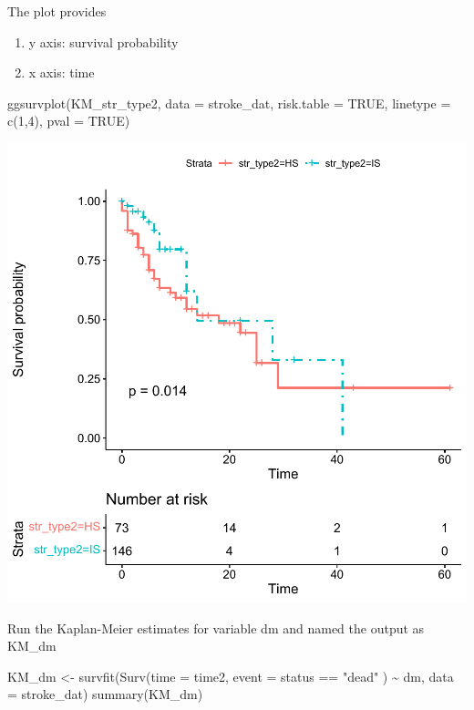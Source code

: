 \documentclass[
]{book}
\makeatletter
\newenvironment{Shaded}{\begin{snugshade}}{\end{snugshade}}
\newcommand{\AttributeTok}[1]{\textcolor[rgb]{0.61,0.61,0.61}{#1}}
\newcommand{\ConstantTok}[1]{\textcolor[rgb]{0,0,0}{#1}}
\newcommand{\DecValTok}[1]{\textcolor[rgb]{0.06,0.06,0.06}{#1}}
\newcommand{\FunctionTok}[1]{\textcolor[rgb]{0,0,0}{#1}}
\newcommand{\NormalTok}[1]{#1}
\newcommand{\OtherTok}[1]{\textcolor[rgb]{0.37,0.37,0.37}{#1}}
\newcommand{\SpecialCharTok}[1]{\textcolor[rgb]{0,0,0}{#1}}
\newcommand{\StringTok}[1]{\textcolor[rgb]{0.5,0.5,0.5}{#1}}
\providecommand{\tightlist}{%
  \setlength{\itemsep}{0pt}\setlength{\parskip}{0pt}}
\newenvironment{kframe}{%
\medskip{}
\setlength{\fboxsep}{.8em}
 \def\at@end@of@kframe{}%
 \ifinner\ifhmode%
  \def\at@end@of@kframe{\end{minipage}}%
  \begin{minipage}{\columnwidth}%
 \fi\fi%
 \def\FrameCommand##1{\hskip\@totalleftmargin \hskip-\fboxsep
 \colorbox{shadecolor}{##1}\hskip-\fboxsep
     \hskip-\linewidth \hskip-\@totalleftmargin \hskip\columnwidth}%
 \MakeFramed {\advance\hsize-\width
   \@totalleftmargin\z@ \linewidth\hsize
   \@setminipage}}%
 {\par\unskip\endMakeFramed%
 \at@end@of@kframe}
\renewenvironment{Shaded}{\begin{kframe}}{\end{kframe}}
\makeatother
\begin{document}
The plot provides

\begin{enumerate}
\def\labelenumi{\arabic{enumi}.}
\tightlist
\item
  y axis: survival probability
\item
  x axis: time
\end{enumerate}

\begin{Shaded}
\begin{Highlighting}[]
\FunctionTok{ggsurvplot}\NormalTok{(KM\_str\_type2, }\AttributeTok{data =}\NormalTok{ stroke\_dat, }\AttributeTok{risk.table =} \ConstantTok{TRUE}\NormalTok{, }
           \AttributeTok{linetype =} \FunctionTok{c}\NormalTok{(}\DecValTok{1}\NormalTok{,}\DecValTok{4}\NormalTok{), }\AttributeTok{pval =} \ConstantTok{TRUE}\NormalTok{)}
\end{Highlighting}
\end{Shaded}

\begin{center}\includegraphics[width=0.7\linewidth,keepaspectratio]{Multivariable_Data_Analysis_files/figure-latex/unnamed-chunk-173-1} \end{center}

Run the Kaplan-Meier estimates for variable dm and named the output as KM\_dm

\begin{Shaded}
\begin{Highlighting}[]
\NormalTok{KM\_dm }\OtherTok{\textless{}{-}} \FunctionTok{survfit}\NormalTok{(}\FunctionTok{Surv}\NormalTok{(}\AttributeTok{time =}\NormalTok{ time2, }\AttributeTok{event =}\NormalTok{ status }\SpecialCharTok{==} \StringTok{"dead"}\NormalTok{ ) }\SpecialCharTok{\textasciitilde{}}\NormalTok{ dm, }
                        \AttributeTok{data =}\NormalTok{ stroke\_dat)}
\FunctionTok{summary}\NormalTok{(KM\_dm)}
\end{Highlighting}
\end{Shaded}
\end{document}
